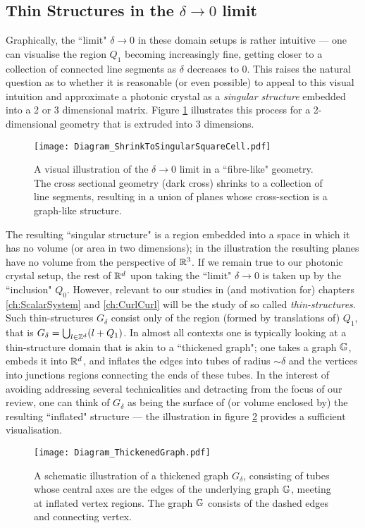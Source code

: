 \subsection{Thin Structures in the $\delta\rightarrow0$ limit} \label{ssec:Intro-ThinStructures}

Graphically, the ``limit" $\delta\rightarrow0$ in these domain setups is rather intuitive --- one can visualise the region $Q_1$ becoming increasingly fine, getting closer to a collection of connected line segments as $\delta$ decreases to 0.
This raises the natural question as to whether it is reasonable (or even possible) to appeal to this visual intuition and approximate a photonic crystal as a \emph{singular structure} embedded into a 2 or 3 dimensional matrix.
Figure \ref{fig:Diagram_ShrinkToSingularSquareCell} illustrates this process for a 2-dimensional geometry that is extruded into 3 dimensions.
\begin{figure}[h]
	\centering
	\texttt{[image: Diagram\_ShrinkToSingularSquareCell.pdf]}
	\caption{\label{fig:Diagram_ShrinkToSingularSquareCell} A visual illustration of the $\delta\rightarrow0$ limit in a ``fibre-like" geometry. The cross sectional geometry (dark cross) shrinks to a collection of line segments, resulting in a union of planes whose cross-section is a graph-like structure.}
\end{figure}
The resulting ``singular structure" is a region embedded into a space in which it has no volume (or area in two dimensions); in the illustration the resulting planes have no volume from the perspective of $\mathbb{R}^3$.
If we remain true to our photonic crystal setup, the rest of $\mathbb{R}^d$ upon taking the ``limit" $\delta\rightarrow0$ is taken up by the ``inclusion" $Q_0$.
However, relevant to our studies in (and motivation for) chapters \ref{ch:ScalarSystem} and \ref{ch:CurlCurl} will be the study of so called \emph{thin-structures}.
Such thin-structures $G_{\delta}$ consist only of the region (formed by translations of) $Q_1$, that is $G_{\delta} = \bigcup_{l\in\mathbb{Z}^d}(l+Q_1)$.
In almost all contexts one is typically looking at a thin-structure domain that is akin to a ``thickened graph"; one takes a graph $\mathbb{G}$, embeds it into $\mathbb{R}^d$, and inflates the edges into tubes of radius $\sim\delta$ and the vertices into junctions regions connecting the ends of these tubes.
In the interest of avoiding addressing several technicalities and detracting from the focus of our review, one can think of $G_{\delta}$ as being the surface of (or volume enclosed by) the resulting ``inflated" structure --- the illustration in figure \ref{fig:Diagram_ThickenedGraph} provides a sufficient visualisation.
\begin{figure}[t]
	\centering
	\texttt{[image: Diagram\_ThickenedGraph.pdf]}
	\caption{\label{fig:Diagram_ThickenedGraph} A schematic illustration of a thickened graph $G_{\delta}$, consisting of tubes whose central axes are the edges of the underlying graph $\mathbb{G}$, meeting at inflated vertex regions. The graph $\mathbb{G}$ consists of the dashed edges and connecting vertex.}
\end{figure}

